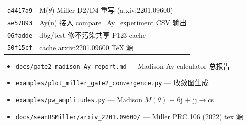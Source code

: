 \documentclass[11pt,a4paper]{article}
\begin{document}
\begin{tabularx}{\linewidth}{lX}
\toprule
\texttt{a4417a9} & M($\theta$) Miller D2/D4 重写 (arxiv:2201.09600) \\
\texttt{ae57893} & Ay(n) 接入 compare\_Ay\_experiment CSV 输出 \\
\texttt{06fadde} & dbg/test 修不污染共享 P123 cache \\
\texttt{50f15cf} & cache arxiv:2201.09600 TeX 源 \\
\bottomrule
\end{tabularx}

\begin{itemize}
\item \texttt{docs/gate2\_madison\_Ay\_report.md} — Madison Ay calculator 总报告
\item \texttt{examples/plot\_miller\_gate2\_convergence.py} — 收敛图生成
\item \texttt{examples/pw\_amplitudes.py} — Madison $M(\theta)$ + 6j + jj$\to$cs
\item \texttt{docs/seanBSMiller/arxiv\_2201.09600/} — Miller PRC 106 (2022) tex 源
\end{itemize}
\end{document}
